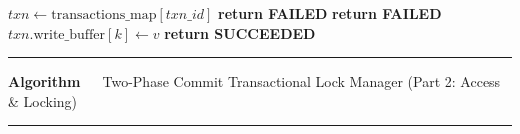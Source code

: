 \documentclass{article}
\begin{document}
\begin{algorithmic}[1]
\Statex
{}
    \State $txn \gets \text{transactions\_map}[txn\_id]$
        \State \textbf{return FAILED}
    \EndIf
        \State {}
        \State \textbf{return FAILED}
    \EndIf
    \State $txn.\text{write\_buffer}[k] \gets v$
    \State \textbf{return SUCCEEDED}
\EndProcedure

\end{algorithmic}
\vspace{2pt}\hrule
\endgroup
\bigskip
\newpage
\begingroup
{}
\noindent\textbf{Algorithm~\thealgorithm}\ \ Two-Phase Commit Transactional Lock Manager (Part 2: Access \& Locking)\par\nopagebreak\vspace{2pt}\hrule\vspace{2pt}
\small
\end{document}
